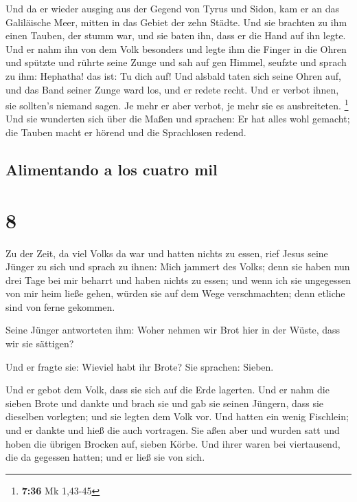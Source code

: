  Und da er wieder ausging aus der Gegend von Tyrus und
Sidon, kam er an das Galiläische Meer, mitten in das Gebiet der zehn
Städte.  Und sie brachten zu ihm einen Tauben, der stumm
war, und sie baten ihn, dass er die Hand auf ihn legte. 
Und er nahm ihn von dem Volk besonders und legte ihm die Finger in die
Ohren und spützte und rührte seine Zunge  und sah auf gen
Himmel, seufzte und sprach zu ihm: Hephatha! das ist: Tu dich auf!
 Und alsbald taten sich seine Ohren auf, und das Band
seiner Zunge ward los, und er redete recht.  Und er
verbot ihnen, sie sollten's niemand sagen. Je mehr er aber verbot, je
mehr sie es ausbreiteten. \footnote{\textbf{7:36} Mk 1,43-45}
 Und sie wunderten sich über die Maßen und sprachen: Er
hat alles wohl gemacht; die Tauben macht er hörend und die Sprachlosen
redend.

\hypertarget{alimentando-a-los-cuatro-mil}{%
\subsection{Alimentando a los cuatro
mil}\label{alimentando-a-los-cuatro-mil}}

\hypertarget{section-7}{%
\section{8}\label{section-7}}

 Zu der Zeit, da viel Volks da war und hatten nichts zu
essen, rief Jesus seine Jünger zu sich und sprach zu ihnen:
 Mich jammert des Volks; denn sie haben nun drei Tage bei
mir beharrt und haben nichts zu essen;  und wenn ich sie
ungegessen von mir heim ließe gehen, würden sie auf dem Wege
verschmachten; denn etliche sind von ferne gekommen.

 Seine Jünger antworteten ihm: Woher nehmen wir Brot hier
in der Wüste, dass wir sie sättigen?

 Und er fragte sie: Wieviel habt ihr Brote? Sie sprachen:
Sieben.

 Und er gebot dem Volk, dass sie sich auf die Erde
lagerten. Und er nahm die sieben Brote und dankte und brach sie und gab
sie seinen Jüngern, dass sie dieselben vorlegten; und sie legten dem
Volk vor.  Und hatten ein wenig Fischlein; und er dankte
und hieß die auch vortragen.  Sie aßen aber und wurden
satt und hoben die übrigen Brocken auf, sieben Körbe.  Und
ihrer waren bei viertausend, die da gegessen hatten; und er ließ sie von
sich.

